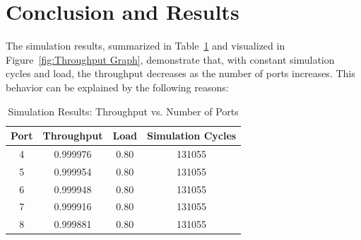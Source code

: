 \documentclass[12pt	]{article}
\begin{document}
\section{Conclusion and Results}

The simulation results, summarized in {Table~\ref{table:results}} and visualized in Figure~\ref{fig:Throughput Graph}, demonstrate that, with constant {simulation cycles} and {load}, the {throughput} decreases as the {number of ports} increases. This behavior can be explained by the following reasons:

\begin{table}[h!]
	\centering
	\caption{Simulation Results: Throughput vs. Number of Ports}
	\label{table:results}
	\begin{tabular}{||c c c c||}
		\hline
		\textbf{Port} & \textbf{Throughput} & \textbf{Load} & \textbf{Simulation Cycles} \\\hline\hline
		4 & 0.999976 & 0.80 & 131055 \\ 
		5 & 0.999954 & 0.80 & 131055 \\ 
		6 & 0.999948 & 0.80 & 131055 \\ 
		7 & 0.999916 & 0.80 & 131055 \\ 
		8 & 0.999881 & 0.80 & 131055 \\ \hline
	\end{tabular}
\end{table}
\end{document}
